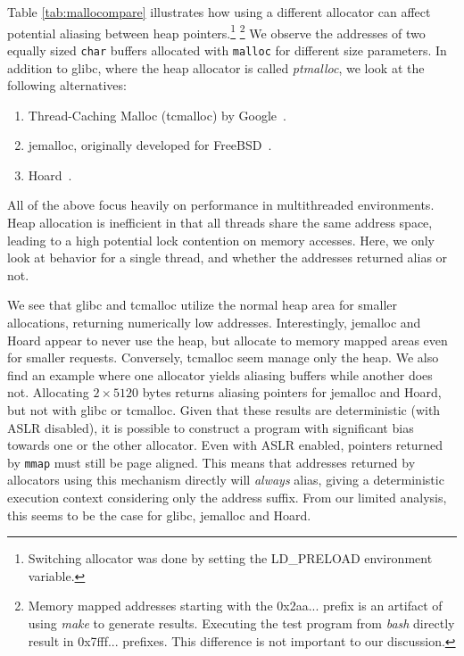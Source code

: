 \documentclass[10pt, conference, compsocconf]{IEEEtran}
\begin{document}
Table \ref{tab:mallocompare} illustrates how using a different allocator can affect potential aliasing between heap pointers.\footnote{Switching allocator was done by setting the LD\_PRELOAD environment variable.} \footnote{Memory mapped addresses starting with the 0x2aa... prefix is an artifact of using \emph{make} to generate results. Executing the test program from \emph{bash} directly result in 0x7fff... prefixes. This difference is not important to our discussion.}
We observe the addresses of two equally sized \texttt{char} buffers allocated with \texttt{malloc} for different size parameters.
In addition to glibc, where the heap allocator is called \emph{ptmalloc}, we look at the following alternatives:
\begin{enumerate}
  \item Thread-Caching Malloc (tcmalloc) by Google~\cite{TCMalloc}.
  \item jemalloc, originally developed for FreeBSD~\cite{JEMalloc}.
  \item Hoard~\cite{Berger:2000:Hoard}.
\end{enumerate}
All of the above focus heavily on performance in multithreaded environments.
Heap allocation is inefficient in that all threads share the same address space, leading to a high potential lock contention on memory accesses.
Here, we only look at behavior for a single thread, and whether the addresses returned alias or not.

We see that glibc and tcmalloc utilize the normal heap area for smaller allocations, returning numerically low addresses. %
Interestingly, jemalloc and Hoard appear to never use the heap, but allocate to memory mapped areas even for smaller requests.
Conversely, tcmalloc seem manage only the heap.
We also find an example where one allocator yields aliasing buffers while another does not.
Allocating $2 \times 5120$ bytes returns aliasing pointers for jemalloc and Hoard, but not with glibc or tcmalloc.
Given that these results are deterministic (with ASLR disabled), it is possible to construct a program with significant bias towards one or the other allocator.
Even with ASLR enabled, pointers returned by \texttt{mmap} must still be page aligned.
This means that addresses returned by allocators using this mechanism directly will \emph{always} alias, giving a deterministic execution context considering only the address suffix.
From our limited analysis, this seems to be the case for glibc, jemalloc and Hoard.
\end{document}
